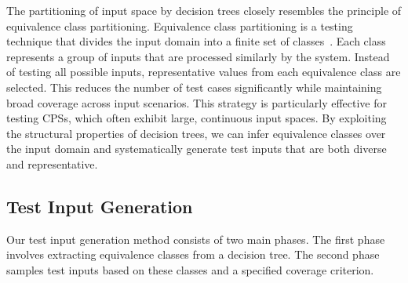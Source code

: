 \documentclass[
]{ceurart}
\theoremstyle{definition}
\begin{document}
The partitioning of input space by decision trees closely resembles the principle of equivalence class partitioning. Equivalence class partitioning is a testing technique that divides the input domain into a finite set of classes~\cite{ecp}. Each class represents a group of inputs that are processed similarly by the system. Instead of testing all possible inputs, representative values from each equivalence class are selected. This reduces the number of test cases significantly while maintaining broad coverage across input scenarios. This strategy is particularly effective for testing CPSs, which often exhibit large, continuous input spaces. By exploiting the structural properties of decision trees, we can infer equivalence classes over the input domain and systematically generate test inputs that are both diverse and representative.

\subsection{Test Input Generation}
\label{sec:test}

Our test input generation method consists of two main phases. The first phase involves extracting equivalence classes from a decision tree. The second phase samples test inputs based on these classes and a specified coverage criterion.
\end{document}
